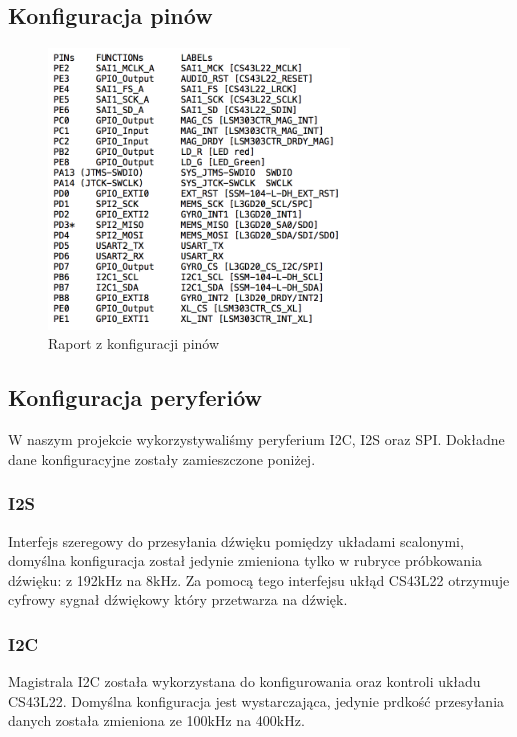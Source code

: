 \documentclass[10pt, a4paper]{article}
\begin{document}
\subsection{Konfiguracja pinów}
\begin{figure}[H]
	\centering
	\includegraphics[width=80mm]{conf99.png}
	\caption{Raport z konfiguracji pinów}
	\end{figure}
\subsection{Konfiguracja peryferiów}
W naszym projekcie wykorzystywaliśmy peryferium I2C, I2S oraz SPI. Dokładne dane konfiguracyjne zostały zamieszczone poniżej.
\subsubsection{I2S}
Interfejs szeregowy do przesyłania dźwięku pomiędzy układami scalonymi, domyślna konfiguracja został jedynie zmieniona tylko w rubryce próbkowania dźwięku: z 192kHz na 8kHz. Za pomocą tego interfejsu ukłąd CS43L22 otrzymuje cyfrowy sygnał dźwiękowy który przetwarza na dźwięk.
\subsubsection{I2C}
Magistrala I2C została wykorzystana do konfigurowania oraz kontroli układu CS43L22. Domyślna konfiguracja jest wystarczająca, jedynie prdkość przesyłania danych została zmieniona ze 100kHz na 400kHz. 
\end{document}
